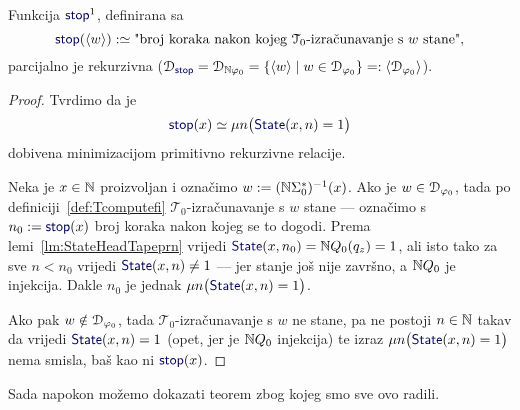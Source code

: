 \begin{lema}[{name=[parcijalna rekurzivnost brojenja koraka do zaustavljanja]}]\label{lm:stopprek}
Funkcija $\f{stop}^1$\!, definirana sa
\begin{equation}
    \f{stop}(\kr w):\simeq\text{"broj koraka nakon kojeg $\mathcal T_0$-izračunavanje s $w$ stane",}
\end{equation}
    parcijalno je rekurzivna ($\dom{\f{stop}}=\dom{\N\varphi_0}=\{\kr w\mid w\in\dom{\varphi_0}\}=:\kr{\dom{\varphi_0}}$).
\end{lema}
\begin{proof}
Tvrdimo da je
\begin{equation}\label{eq:stopdef}
    \f{stop}(x)\simeq\mu n\bigl(\f{State}(x,n)=1\bigr)
\end{equation}
dobivena minimizacijom primitivno rekurzivne relacije.

Neka je $x\in{\mathbb N}$ proizvoljan i označimo $w:=({\mathbb N}\Sigma_0^*)^{-1}(x)$. Ako je $w\in\mathcal D_{\varphi_0}$, tada po definiciji~\ref{def:Tcomputefi} $\mathcal T_0$-izračunavanje s $w$ stane --- označimo s $n_0:=\f{stop}(x)$ broj koraka nakon kojeg se to dogodi. Prema lemi~\ref{lm:StateHeadTapeprn} vrijedi $\f{State}(x,n_0)=\N Q_0(q_z)=1$, ali isto tako za sve $n<n_0$ vrijedi $\f{State}(x,n)\ne 1$ --- jer stanje još nije završno, a ${\mathbb N} Q_0$ je injekcija. Dakle $n_0$ je jednak $\mu n\bigl(\f{State}(x,n)=1\bigr)$.

Ako pak $w\notin\mathcal D_{\varphi_0}$, tada $\mathcal T_0$-izračunavanje s $w$ ne stane, pa ne postoji $n\in{\mathbb N}$ takav da vrijedi $\f{State}(x,n)=1$ (opet, jer je ${\mathbb N} Q_0$ injekcija) te izraz $\mu n\bigl(\f{State}(x,n)=1\bigr)$ nema smisla, baš kao ni $\f{stop}(x)$.
\end{proof}

Sada napokon možemo dokazati teorem zbog kojeg smo sve ovo radili.

